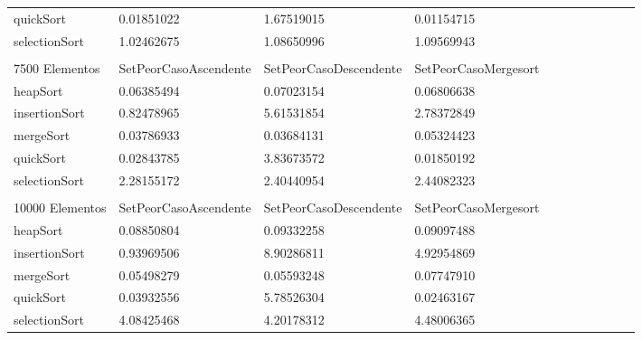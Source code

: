 \documentclass[article,a4paper]{article}
\begin{document}
\begin{table}[h]
\begin{adjustbox}{width=\textwidth,totalheight=\textheight,keepaspectratio}
\begin{tabular}{lllllllllll}
quickSort       & 0.01851022            & 1.67519015             & 0.01154715           \\
selectionSort   & 1.02462675            & 1.08650996             & 1.09569943           \\
                &                       &                        &                      \\
7500 Elementos  & SetPeorCasoAscendente & SetPeorCasoDescendente & SetPeorCasoMergesort \\
heapSort        & 0.06385494            & 0.07023154             & 0.06806638           \\
insertionSort   & 0.82478965            & 5.61531854             & 2.78372849           \\
mergeSort       & 0.03786933            & 0.03684131             & 0.05324423           \\
quickSort       & 0.02843785            & 3.83673572             & 0.01850192           \\
selectionSort   & 2.28155172            & 2.40440954             & 2.44082323           \\
                &                       &                        &                      \\
10000 Elementos & SetPeorCasoAscendente & SetPeorCasoDescendente & SetPeorCasoMergesort \\
heapSort        & 0.08850804            & 0.09332258             & 0.09097488           \\
insertionSort   & 0.93969506            & 8.90286811             & 4.92954869           \\
mergeSort       & 0.05498279            & 0.05593248             & 0.07747910           \\
quickSort       & 0.03932556            & 5.78526304             & 0.02463167           \\
selectionSort   & 4.08425468            & 4.20178312             & 4.48006365
\end{tabular}
\end{adjustbox}
\end{table}
\end{document}
